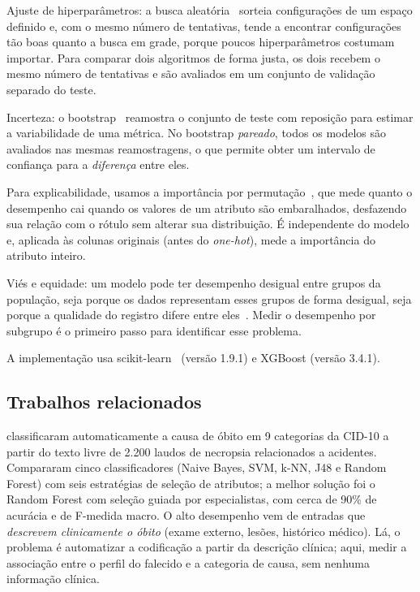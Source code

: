 \documentclass[12pt]{article}
\begin{document}
Ajuste de hiperparâmetros: a busca aleatória~\cite{bergstra2012} sorteia configurações de um espaço definido e, com o mesmo número de tentativas, tende a encontrar configurações tão boas quanto a busca em grade, porque poucos hiperparâmetros costumam importar. Para comparar dois algoritmos de forma justa, os dois recebem o mesmo número de tentativas e são avaliados em um conjunto de validação separado do teste.

Incerteza: o bootstrap~\cite{efron1993} reamostra o conjunto de teste com reposição para estimar a variabilidade de uma métrica. No bootstrap \emph{pareado}, todos os modelos são avaliados nas mesmas reamostragens, o que permite obter um intervalo de confiança para a \emph{diferença} entre eles.

Para explicabilidade, usamos a importância por permutação~\cite{breiman2001,fisher2019}, que mede quanto o desempenho cai quando os valores de um atributo são embaralhados, desfazendo sua relação com o rótulo sem alterar sua distribuição. É independente do modelo e, aplicada às colunas originais (antes do \emph{one-hot}), mede a importância do atributo inteiro.

Viés e equidade: um modelo pode ter desempenho desigual entre grupos da população, seja porque os dados representam esses grupos de forma desigual, seja porque a qualidade do registro difere entre eles~\cite{mehrabi2021}. Medir o desempenho por subgrupo é o primeiro passo para identificar esse problema.

A implementação usa scikit-learn~\cite{pedregosa2011} (versão 1.9.1) e XGBoost (versão 3.4.1).

\subsection{Trabalhos relacionados}

\cite{mujtaba2017} classificaram automaticamente a causa de óbito em 9 categorias da CID-10 a partir do texto livre de 2.200 laudos de necropsia relacionados a acidentes. Compararam cinco classificadores (Naive Bayes, SVM, k-NN, J48 e Random Forest) com seis estratégias de seleção de atributos; a melhor solução foi o Random Forest com seleção guiada por especialistas, com cerca de 90\% de acurácia e de F-medida macro. O alto desempenho vem de entradas que \emph{descrevem clinicamente o óbito} (exame externo, lesões, histórico médico). Lá, o problema é automatizar a codificação a partir da descrição clínica; aqui, medir a associação entre o perfil do falecido e a categoria de causa, sem nenhuma informação clínica.
\end{document}
